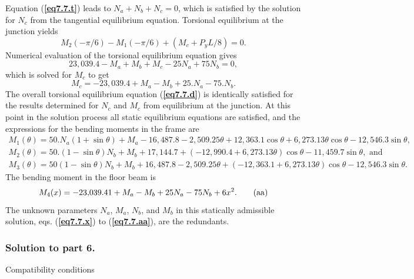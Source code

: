 \documentclass{AeroStructure-ERJohnson}
\begin{document}
\begin{example}
\pagebreak

\noindent Equation (\textbf{\ref{eq7.7.t}}) leads to $N_{a}+N_{b}+N_{c}=0$, which is satisfied by the solution for $\textit{N}_{{c}}$ from the tangential equilibrium equation. Torsional equilibrium at the junction yields
\begin{equation}
M_{2}(-\pi / 6)-M_{1}(-\pi / 6)+\left(M_{c}+P_{y} L / 8\right)=0. \label{eq7.7.u}\tag{u}
\end{equation}
Numerical evaluation of the torsional equilibrium equation gives
\begin{equation}
23{,}039.4-M_{a}+M_{b}+M_{c}-25 N_{a}+75 N_{b}=0, \label{eq7.7.v}\tag{v}
\end{equation}
which is solved for $\textit{M}_{{c}}$ to get
\begin{equation}
M_{c}=-23{,}039.4+M_{a}-M_{b}+25 . N_{a}-75 . N_{b}. \label{eq7.7.w}\tag{w}
\end{equation}
The overall torsional equilibrium equation (\textbf{\ref{eq7.7.d}}) is identically satisfied for the results determined for $N_{{c}}$ and $M_{{c}}$ from equilibrium at the junction. At this point in the solution process all static equilibrium equations are satisfied, and the expressions for the bending moments in the frame are
\begin{gather}
M_{1}(\theta)=50 . N_{a}(1+\sin \theta)+M_{a}-16{,}487.8-2{,}509.25 \theta+12{,}363.1 \cos \theta+6{,}273.13 \theta \cos \theta-12{,}546.3 \sin \theta, \label{eq7.7.x}\tag{x} \\
M_{2}(\theta)=50 .(1-\sin \theta) N_{b}+M_{b}+17{,}144.7+(-12{,}990.4+6{,}273.13 \theta) \cos \theta-11{,}459.7 \sin \theta, \textrm{ and}\label{eq7.7.y}\tag{y} \\
M_{3}(\theta)=50(1-\sin \theta) N_{b}+M_{b}+16{,}487.8-2{,}509.25 \theta+(-12{,}363.1+6{,}273.13 \theta) \cos \theta-12{,}546.3 \sin \theta. \label{eq7.7.z}\tag{z}
\end{gather}
The bending moment in the floor beam is
\begin{equation}
M_{4}(x)=-23{,}039.41+M_{a}-M_{b}+25 N_{a}-75 N_{b}+6 x^{2}. \label{eq7.7.aa}\tag{{aa}}
\end{equation}
The unknown parameters $N_{{a}}$, $M_{{a}}$, $N_{{b}}$, and $M_{{b}}$ in this statically admissible solution, eqs. (\textbf{\ref{eq7.7.x}}) to (\textbf{\ref{eq7.7.aa}}), are the redundants.

\subsubsection{Solution to part 6.} Compatibility conditions


\end{example}
\end{document}
